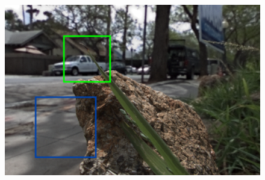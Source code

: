 \documentclass[10pt,twocolumn,letterpaper]{article}
\begin{document}
\begin{figure}[p]
\begin{multicols}{3}
    \end{multicols}
    \begin{multicols}{2}
        \includegraphics[width=\linewidth]{truth_05_05_map.png}
        \begin{multicols}{3}

\end{multicols}
\end{multicols}
\end{figure}
\end{document}
